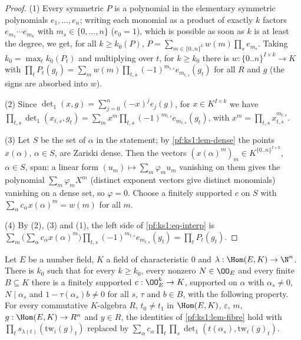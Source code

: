 \begin{proof}
(1) Every symmetric $P$ is a polynomial in the elementary symmetric polynomials $e_1,\dots,e_n$; writing each monomial as a product of
exactly $k$ factors $e_{m_1}\cdots e_{m_k}$ with $m_s\in\{0,\dots,n\}$ ($e_0=1$), which is possible as soon as $k$ is at least the degree,
we get, for all $k\ge k_0(P)$, $P=\sum_{m\in\{0..n\}^k}w(m)\prod_se_{m_s}$. Taking
$k_0=\max_tk_0(P_t)$ and multiplying over $t$, for $k\ge k_0$ there is $w:\{0..n\}^{I\times k}\to K$ with
$\prod_tP_t(g_t)=\sum_mw(m)\prod_{t,s}(-1)^{m_{t,s}}e_{m_{t,s}}(g_t)$ for all $R$ and $g$
(the signs are absorbed into $w$).

(2) Since $\det_1(x,g)=\sum_{j=0}^n(-x)^je_j(g)$, for $x\in K^{I\times k}$ we have
$\prod_{t,s}\det_1(x_{t,s},g_t)=\sum_mx^m\prod_{t,s}(-1)^{m_{t,s}}e_{m_{t,s}}(g_t)$, with $x^m=\prod_{t,s}x_{t,s}^{m_{t,s}}$.

(3) Let $S$ be the set of $\alpha$ in the statement; by \cref{pf:ks1:lem-dense} the points $x(\alpha)$, $\alpha\in S$, are Zariski dense. Then the
vectors $(x(\alpha)^m)_m\in K^{\{0..n\}^{I\times k}}$, $\alpha\in S$, span: a linear form $(u_m)\mapsto\sum_m\varphi_mu_m$ vanishing on them
gives the polynomial $\sum_m\varphi_mX^m$ (distinct exponent vectors give distinct monomials) vanishing on a dense set, so $\varphi=0$. Choose a finitely supported $c$ on $S$ with $\sum_\alpha c_\alpha x(\alpha)^m=w(m)$ for all $m$.

(4) By (2), (3) and (1), the left side of \eqref{pf:ks1:eq-interp} is
$\sum_m\bigl(\sum_\alpha c_\alpha x(\alpha)^m\bigr)\prod_{t,s}(-1)^{m_{t,s}}e_{m_{t,s}}(g_t)=\prod_tP_t(g_t)$.
\end{proof}

\begin{proposition}\label{pf:ks1:prop-fibresum}
Let $E$ be a number field, $K$ a field of characteristic $0$ and $\lambda:\Hom(E,K)\to\N^n$. There is $k_0$ such that for every $k\ge k_0$,
every nonzero $N\in\OO_E$ and every finite $B\subseteq K$ there is a finitely supported $c:\OO_E^k\to K$, supported on $\alpha$ with
$\alpha_s\neq0$, $N\mid\alpha_s$ and $1-\tau(\alpha_s)b\neq0$ for all $s$, $\tau$ and $b\in B$, with the following property. For every
commutative $K$-algebra $R$, $t_0\neq t_1$ in $\Hom(E,K)$, $\varepsilon$, $m$, $g:\Hom(E,K)\to R^n$ and $y\in R$, the identities of
\cref{pf:ks1:lem-fibre} hold with $\prod_ts_{\lambda(t)}(\mathrm{tw}_i(g)_t)$ replaced by
$\sum_\alpha c_\alpha\prod_t\prod_s\det_1(t(\alpha_s),\mathrm{tw}_i(g)_t)$.
\end{proposition}

